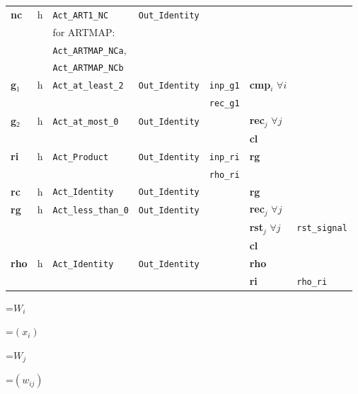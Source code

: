 {\begin{tabular}{|l|c|l|l|l||l|l|}
{\bf nc} & h & {\tt Act\_ART1\_NC} & {\tt Out\_Identity}  & & & \\ 
& & for ARTMAP: & & & & \\ 
& & {\tt Act\_ARTMAP\_NCa}, & & & & \\ 
& & {\tt Act\_ARTMAP\_NCb} & & & & \\ 
\hline
%
{\bf g}$_1$  & h & {\tt Act\_at\_least\_2} & {\tt Out\_Identity}  & {\tt inp\_g1} &
            {\bf cmp}$_{i}$ $\forall i$ & \\ 
& & & & {\tt rec\_g1} & & \\ 
\hline
%
{\bf g}$_2$  & h & {\tt Act\_at\_most\_0} & {\tt Out\_Identity}  & & {\bf rec}$_{j}$ $\forall j$ & \\ 
& & & & & {\bf cl} & \\ 
\hline
%
{\bf ri} & h & {\tt Act\_Product} & {\tt Out\_Identity}  & {\tt inp\_ri} &
           {\bf rg} & \\ 
& & & & {\tt rho\_ri} & & \\ 
\hline
%
{\bf rc} & h & {\tt Act\_Identity}  & {\tt Out\_Identity}  & & {\bf rg} & \\ 
\hline
%
{\bf rg} & h & {\tt Act\_less\_than\_0} & {\tt Out\_Identity}  & & {\bf rec}$_{j}$ $\forall j$ & \\ 
& & & & & {\bf rst}$_{j}$ $\forall j$ & {\tt rst\_signal} \\ 
& & & & & {\bf cl} & \\ 
\hline
%
{\bf rho} & h & {\tt Act\_Identity}  & {\tt Out\_Identity}  & & {\bf rho} & \\ 
& & & & & {\bf ri} & {\tt rho\_ri} \\ 
\hline
%
\end{tabular}
}

{\newpage
\clearpage
\samepage \setbox\sizebox=\hbox{$W_i$}\box\sizebox
}

{\newpage
\clearpage
\samepage \setbox\sizebox=\hbox{$(x_i)$}\box\sizebox
}

{\newpage
\clearpage
\samepage \setbox\sizebox=\hbox{$W_j$}\box\sizebox
}

{\newpage
\clearpage
\samepage \setbox\sizebox=\hbox{$(w_{ij})$}\box\sizebox
}

